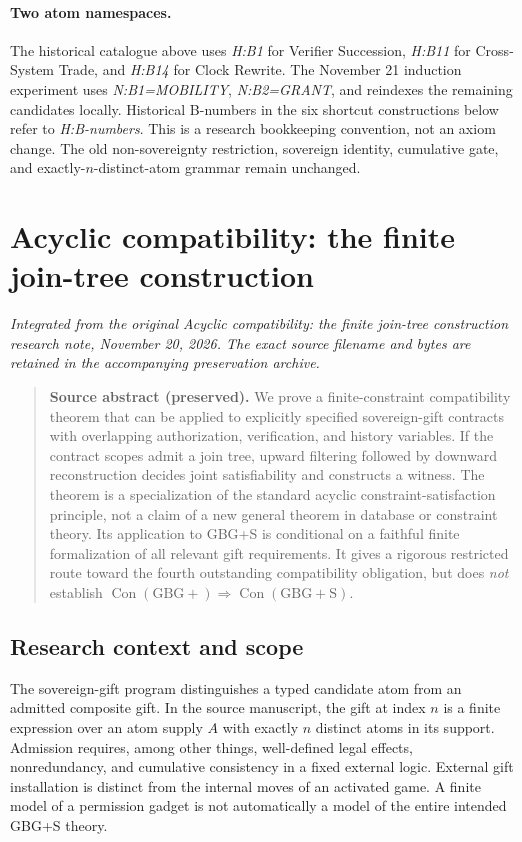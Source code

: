 \documentclass[11pt,letterpaper]{article}
\theoremstyle{definition}\newtheorem{definition}[theorem]{Definition}\newtheorem{example}[theorem]{Example}
\theoremstyle{remark}\newtheorem{remark}[theorem]{Remark}
\newcommand{\Con}{\operatorname{Con}}
\begin{document}
\paragraph{Two atom namespaces.} The historical catalogue above uses \emph{H:B1} for Verifier Succession, \emph{H:B11} for Cross-System Trade, and \emph{H:B14} for Clock Rewrite. The November 21 induction experiment uses \emph{N:B1=MOBILITY}, \emph{N:B2=GRANT}, and reindexes the remaining candidates locally. Historical B-numbers in the six shortcut constructions below refer to \emph{H:B-numbers}. This is a research bookkeeping convention, not an axiom change. The old non-sovereignty restriction, sovereign identity, cumulative gate, and exactly-$n$-distinct-atom grammar remain unchanged.


\section{Acyclic compatibility: the finite join-tree construction}\label{br:sec:compat}
\noindent\textit{Integrated from the original Acyclic compatibility: the finite join-tree construction research note, November 20, 2026. The exact source filename and bytes are retained in the accompanying preservation archive.}

\begin{quote}\small\textbf{Source abstract (preserved).} We prove a finite-constraint compatibility theorem that can be applied to explicitly specified sovereign-gift contracts with overlapping authorization, verification, and history variables. If the contract scopes admit a join tree, upward filtering followed by downward reconstruction decides joint satisfiability and constructs a witness. The theorem is a specialization of the standard acyclic constraint-satisfaction principle, not a claim of a new general theorem in database or constraint theory. Its application to GBG+S is conditional on a faithful finite formalization of all relevant gift requirements. It gives a rigorous restricted route toward the fourth outstanding compatibility obligation, but does \emph{not} establish \(\Con(\mathrm{GBG+})\Rightarrow\Con(\mathrm{GBG+S})\).\end{quote}





\subsection{Research context and scope}
The sovereign-gift program distinguishes a typed candidate atom from an admitted composite gift. In the source manuscript, the gift at index \(n\) is a finite expression over an atom supply \(A\) with exactly \(n\) distinct atoms in its support. Admission requires, among other things, well-defined legal effects, nonredundancy, and cumulative consistency in a fixed external logic. External gift installation is distinct from the internal moves of an activated game. A finite model of a permission gadget is not automatically a model of the entire intended GBG+S theory.
\end{document}
